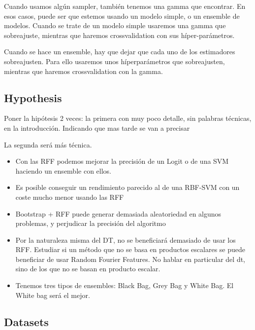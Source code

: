 Cuando usamos algún sampler, también tenemos una gamma que encontrar. En esos
casos, puede ser que estemos usando un modelo simple, o un ensemble de modelos.
Cuando se trate de un modelo simple usaremos una gamma que sobreajuste, mientras
que haremos crossvalidation con sus híper-parámetros.

Cuando se hace un ensemble, hay que dejar que cada uno de los estimadores
sobreajusten. Para ello usaremos unos híperparámetros que sobreajusten, mientras
que haremos crossvalidation con la gamma.

\subsection{Hypothesis}

Poner la hipótesis 2 veces: la primera con muy poco detalle, sin palabras
técnicas, en la introducción. Indicando que mas tarde se van a precisar

La segunda será más técnica.

\begin{itemize}
  \item Con las RFF podemos mejorar la precisión de un Logit o de una SVM
  haciendo un ensemble con ellos.
  \item Es posible conseguir un rendimiento parecido al de una RBF-SVM con
  un coste mucho menor usando las RFF
  \item Bootstrap + RFF puede generar demasiada aleatoriedad en algunos
  problemas, y perjudicar la precisión del algoritmo
  \item Por la naturaleza misma del DT, no se beneficiará demasiado de usar los
  RFF. Estudiar si un método que no se basa en productos escalares se puede
  beneficiar de usar Random Fourier Features. No hablar en particular del dt,
  sino de los que no se basan en producto escalar.
  \item Tenemos tres tipos de ensembles: Black Bag, Grey Bag y White Bag. El
  White bag será el mejor.
\end{itemize}


\subsection{Datasets}

